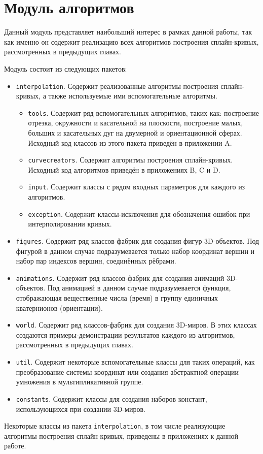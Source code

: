 \section{Модуль алгоритмов}

Данный модуль представляет наибольший интерес в рамках данной работы, так как именно он содержит реализацию всех
алгоритмов построения сплайн-кривых, рассмотренных в предыдущих главах.

Модуль состоит из следующих пакетов:

\begin{itemize}

\item \texttt{interpolation}. Содержит реализованные алгоритмы построения сплайн-кри\-вых, а также используемые ими
вспомогательные алгоритмы.
    \begin{itemize}
    \item \texttt{tools}. Содержит ряд вспомогательных алгоритмов, таких как: построение отрезка, окружности и
    касательной на плоскости, построение малых, больших и касательных дуг на двумерной и ориентационной сферах.
    Исходный код классов из этого пакета приведён в приложении A.
    \item \texttt{curvecreators}. Содержит алгоритмы построения сплайн-кривых. Исходный код алгоритмов
    приведён в приложениях B, C и D.
    \item \texttt{input}. Содержит классы с рядом входных параметров для каждого из алгоритмов.
    \item \texttt{exception}. Содержит классы-исключения для обозначения ошибок при интерполировании кривых.
    \end{itemize}

\item \texttt{figures}. Содержит ряд классов-фабрик для создания фигур 3D-объектов. Под фигурой в данном случае
подразумевается только набор координат вершин и набор пар индексов вершин, соединённых рёбрами.

\item \texttt{animations}. Содержит ряд классов-фабрик для создания анимаций 3D-объек\-тов. Под анимацией в данном
случае подразумевается функция, отображающая вещественные числа (время) в группу единичных кватернионов (ориентации).

\item \texttt{world}. Содержит ряд классов-фабрик для создания 3D-миров. В этих классах создаются примеры-демонстрации
результатов каждого из алгоритмов, рассмотренных в предыдущих главах.

\item \texttt{util}. Содержит некоторые вспомогательные классы для таких операций, как преобразование системы
координат или создания абстрактной операции умножения в мультипликативной группе.

\item \texttt{constants}. Содержит классы для создания наборов констант, использующихся при создании 3D-миров.

\end{itemize}

Некоторые классы из пакета \texttt{interpolation}, в том числе реализующие алгоритмы построения сплайн-кривых,
приведены в приложениях к данной работе.

